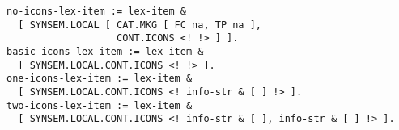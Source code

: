 \documentclass[a4paper]{article}
\begin{document}
{\small\begin{verbatim}
no-icons-lex-item := lex-item & 
  [ SYNSEM.LOCAL [ CAT.MKG [ FC na, TP na ],
                   CONT.ICONS <! !> ] ].
basic-icons-lex-item := lex-item &
  [ SYNSEM.LOCAL.CONT.ICONS <! !> ].
one-icons-lex-item := lex-item &
  [ SYNSEM.LOCAL.CONT.ICONS <! info-str & [ ] !> ].
two-icons-lex-item := lex-item &
  [ SYNSEM.LOCAL.CONT.ICONS <! info-str & [ ], info-str & [ ] !> ].
\end{verbatim}}
\end{document}
